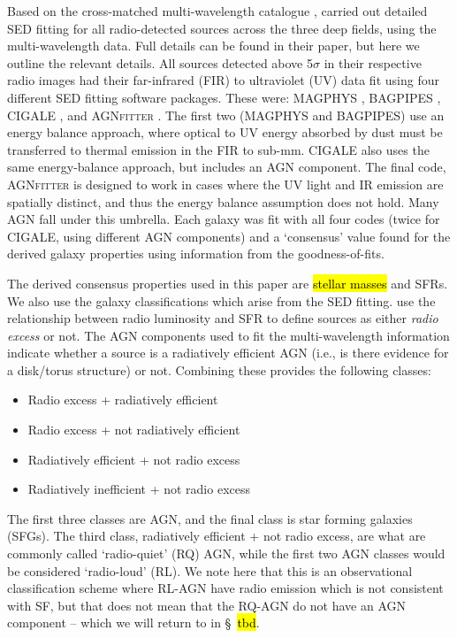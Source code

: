 \documentclass[usenatbib,fleqn,letters]{mnras}
\begin{document}
Based on the cross-matched multi-wavelength catalogue \citep{kondapally_lofar_2021}, \cite{best_lofar_2023} carried out detailed SED fitting for all radio-detected sources across the three deep fields, using the multi-wavelength data. Full details can be found in their paper, but here we outline the relevant details. All sources detected above 5$\sigma$ in their respective radio images had their far-infrared (FIR) to ultraviolet (UV) data fit using four different SED fitting software packages. These were: MAGPHYS \citep{da_cunha_simple_2008}, BAGPIPES \citep{carnall_inferring_2018,carnall_how_2019}, CIGALE \citep{burgarella_star_2005,noll_analysis_2009,boquien_cigale_2019}, and AGN\textsc{fitter} \citep{calistro_rivera_agnfitter_2016}. The first two (MAGPHYS and BAGPIPES) use an energy balance approach, where optical to UV energy absorbed by dust must be transferred to thermal emission in the FIR to sub-mm.  CIGALE also uses the same energy-balance approach, but includes an AGN component. The final code, AGN\textsc{fitter} is designed to work in cases where the UV light and IR emission are spatially distinct, and thus the energy balance assumption does not hold. Many AGN fall under this umbrella. Each galaxy was fit with all four codes (twice for CIGALE, using different AGN components) and a `consensus' value found for the derived galaxy properties using information from the goodness-of-fits.  

The derived consensus properties used in this paper are \hl{stellar masses} and SFRs. We also use the galaxy classifications which arise from the SED fitting. \cite{best_lofar_2023} use the relationship between radio luminosity and SFR to define sources as either \textit{radio excess} or not. The AGN components used to fit the multi-wavelength information indicate whether a source is a radiatively efficient AGN (i.e., is there evidence for a disk/torus structure) or not. Combining these provides the following classes:
\begin{itemize}
    \item Radio excess + radiatively efficient
    \item Radio excess + not radiatively efficient
    \item Radiatively efficient + not radio excess
    \item Radiatively inefficient + not radio excess
\end{itemize}
The first three classes are AGN, and the final class is star forming galaxies (SFGs). The third class, radiatively efficient + not radio excess, are what are commonly called `radio-quiet' (RQ) AGN, while the first two AGN classes would be considered `radio-loud' (RL).  We note here that this is an observational classification scheme where RL-AGN have radio emission which is not consistent with SF, but that does not mean that the RQ-AGN do not have an AGN component -- which we will return to in \S~\hl{tbd}. 
\end{document}

